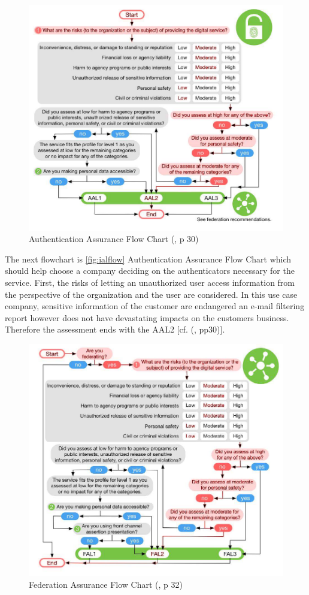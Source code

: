\begin{figure}[h]
	\centering
	\includegraphics[width=0.9\linewidth]{images/aal_flow}
	\caption{Authentication Assurance Flow Chart (\cite{NIST:2017:DIG}, p 30)}
	\label{fig:aalflow}
\end{figure}

The next flowchart is \ref{fig:ialflow} Authentication Assurance Flow Chart which should help choose a company deciding on the authenticators necessary for the service. First, the risks of letting an unauthorized user access information from the perspective of the organization and the user are considered. In this use case company, sensitive information of the customer are endangered an e-mail filtering report however does not have devastating impacts on the customers business. Therefore the assessment ends with the AAL2 [cf. (\cite{NIST:2017:DIG}, pp30)].  

\begin{figure}[h]
	\centering
	\includegraphics[width=0.9\linewidth]{images/fal_flow}
	\caption{Federation Assurance Flow Chart (\cite{NIST:2017:DIG}, p 32)}
	\label{fig:falflow}
\end{figure}

